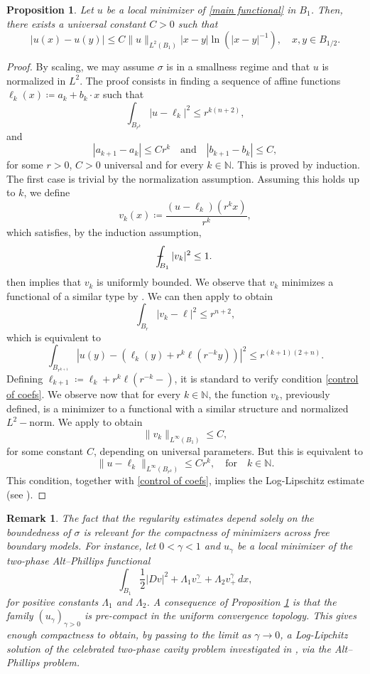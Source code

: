 \documentclass[reqno,11pt]{amsart}
\newtheorem{proposition}{Proposition}[section]
\newtheorem{remark}{Remark}[section]
\newcommand{\1}{\mathds{1}}  %
\newcommand{\intav}[1]{\mathchoice 
  {\mathop{\vrule width 6pt height 3 pt depth -2.5pt \kern -8pt \intop}\nolimits_{\kern -6pt#1}} 
  {\mathop{\vrule width 5pt height 3 pt depth -2.6pt \kern -6pt \intop}\nolimits_{#1}}
  {\mathop{\vrule width 5pt height 3 pt depth -2.6pt \kern -6pt \intop}\nolimits_{#1}}
  {\mathop{\vrule width 5pt height 3 pt depth -2.6pt \kern -6pt \intop}\nolimits_{#1}}}
\numberwithin{equation}{section}
\begin{document}
\begin{proposition}\label{log lipschitz regularity}
Let $u$ be a local minimizer of \eqref{main functional} in $B_1$. Then, there exists a universal constant $C>0$ such that
$$
    |u(x) - u(y)| \leq C\|u\|_{L^2(B_1)}|x-y|\ln\left(|x-y|^{-1}\right),  \quad x,y \in B_{1/2}.
$$
\end{proposition}

\begin{proof}
By scaling, we may assume $\sigma$ is in a smallness regime and that $u$ is normalized in $L^2$. The proof consists in finding a sequence of affine functions $\ell_k(x) \coloneqq a_k + b_k \cdot x$ such that
$$
    \int_{B_{r^k}}|u - \ell_k|^2 \leq r^{k(n+2)},
$$
and
\begin{equation}\label{control of coefs}
    |a_{k+1} - a_k| \leq Cr^{k} \quad \text{and} \quad |b_{k+1} - b_k| \leq C,
\end{equation}
for some $r>0$, $C>0$ universal and for every $k \in \mathbb{N}$. This is proved by induction. The first case is trivial by the normalization assumption. Assuming this holds up to $k$, we define
$$
    v_k(x) \coloneqq \frac{(u-\ell_k)(r^k x)}{r^k},
$$
which satisfies, by the induction assumption,
$$
    \intav{B_1}|v_k|^2 \leq 1.
$$
 then implies that $v_k$ is uniformly bounded. We observe that $v_k$ minimizes a functional of a similar type by . We can then apply  to obtain
$$
    \int_{B_r}|v_k - \ell|^2 \leq r^{n+2},
$$
which is equivalent to
$$
    \int_{B_{r^{k+1}}}\left|u(y) - \left(\ell_k(y) + r^k\ell(r^{-k}y)\right)\right|^2 \leq r^{(k+1)(2+n)}.
$$
Defining $\ell_{k+1} \coloneqq \ell_k + r^k\ell(r^{-k}-)$, it is standard to verify condition \eqref{control of coefs}. We observe now that for every $k \in \mathbb{N}$, the function $v_k$, previously defined, is a minimizer to a functional with a similar structure and normalized $L^2-$norm. We apply  to obtain
$$
    \|v_k\|_{L^\infty(B_1)} \leq C,
$$
for some constant $C$,
depending on universal parameters. But this is equivalent to
$$
    \|u - \ell_k\|_{L^\infty(B_{r^k})} \leq Cr^k, \quad \text{for} \quad k \in \mathbb{N}.
$$
This condition, together with \eqref{control of coefs}, implies the Log-Lipschitz estimate (see \cite{ET14}).
\end{proof}

\begin{remark}
The fact that the regularity estimates depend solely on the boundedness of $\sigma$ is relevant for the compactness of minimizers across free boundary models. For instance, let $0<\gamma<1$ and $u_\gamma$ be a local minimizer of the two-phase Alt--Phillips functional
$$
    \int_{B_1} \frac{1}{2}|Dv|^2 + \Lambda_1 v_{-}^\gamma + \Lambda_2 v_{+}^\gamma \,dx,
$$
for positive constants $\Lambda_1$ and $\Lambda_2$. A consequence of Proposition \ref{log lipschitz regularity} is that the family $(u_\gamma)_{\gamma > 0}$ is pre-compact in the uniform convergence topology. This gives enough compactness to obtain, by passing to the limit as $\gamma \to 0$, a Log-Lipchitz solution of the celebrated two-phase cavity problem investigated in \cite{CJK}, via the Alt--Phillips problem.
\end{remark}
\end{document}
